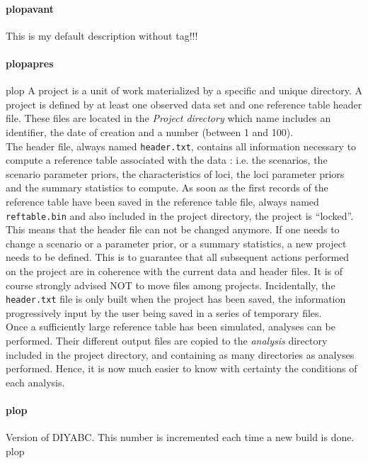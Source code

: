 \documentclass[a4paper]{article}
\begin{document}
        \paragraph{plopavant}
        \label{doc_versionLabel}
        This is my default description without tag!!!

        \paragraph{plopapres}
        plop
        \label{doc_openProjectButton}
        A project is a unit of work materialized by a specific and unique directory. A project is defined by at least one observed data set and one reference table header file. These files are located in the \emph{Project directory} which name includes an identifier, the date of creation and a number (between 1 and 100).\\

        The header file, always named \texttt{header.txt}, contains all information necessary to compute a reference table associated with the data : i.e. the scenarios, the scenario parameter priors, the characteristics of loci, the loci parameter priors and the summary statistics to compute.
        As soon as the first records of the reference table have been saved in the reference table file,  always named \texttt{reftable.bin} and also included in the project directory, the project is ``locked''. This means that the header file can not be changed anymore. If one needs to change a scenario or a parameter prior, or a summary statistics, a new project needs to be defined. This is to guarantee that all subsequent actions performed on the project are in coherence with the current data and header files. It is of course strongly advised NOT to move files among projects.
        Incidentally, the \texttt{header.txt} file is only built when the project has been saved, the information progressively input by the user being saved in a series of temporary files.\\

        Once a sufficiently large reference table has been simulated, analyses can be performed. Their different output files are copied to the \emph{analysis} directory included in the project directory, and containing as many directories as analyses performed. Hence, it is now much easier to know with certainty the conditions of each analysis.    


        \paragraph{plop}
        \label{doc_versionLabel+++plop+++plap}
        Version of DIYABC. This number is incremented each time a new build is done.
        plop
\end{document}
